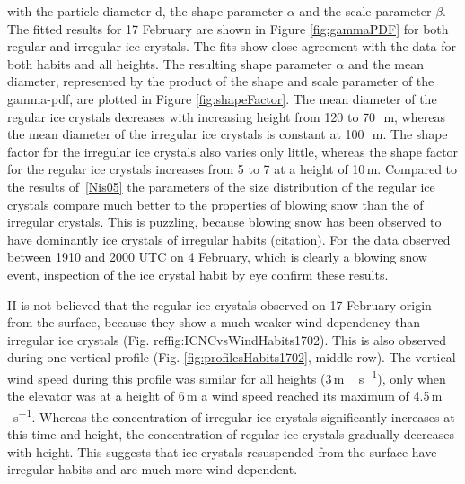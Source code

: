 \documentclass[draft,linenumbers]{agujournal}
\begin{document}
with the particle diameter d, the shape parameter $\alpha$ and the scale parameter $\beta$. The fitted results for 17 February are shown in Figure \ref{fig:gammaPDF} for both regular and irregular ice crystals. The fits show close agreement with the data for both habits and all heights. The resulting shape parameter $\alpha$ and the mean diameter, represented by the product of the shape and scale parameter of the gamma-pdf, are plotted in Figure \ref{fig:shapeFactor}. The mean diameter of the regular ice crystals decreases with increasing height from 120 to 70\,\si{\mu m}, whereas the mean diameter of the irregular ice crystals is constant at 100\,\si{\mu m}. The shape factor for the irregular ice crystals also varies only little, whereas the shape factor for the regular ice crystals increases from 5 to 7 at a height of 10\,\si{m}. Compared to the results of \,\ref{Nis05} the parameters of the size distribution of the regular ice crystals compare much better to the properties of blowing snow than the of irregular crystals. This is puzzling, because blowing snow has been observed to have dominantly ice crystals of irregular habits (citation). For the data observed between 1910 and 2000 UTC on 4 February, which is clearly a blowing snow event, inspection of the ice crystal habit by eye confirm these results. 

II is not believed that the regular ice crystals observed on 17 February origin from the surface, because they show a much weaker wind dependency than irregular ice crystals (Fig. ref{fig:ICNCvsWindHabits1702}). This is also observed during one vertical profile (Fig. \ref{fig:profilesHabits1702}, middle row). The vertical wind speed during this profile was similar for all heights (3\,\si{m\,s^{-1}}), only when the elevator was at a height of 6\,\si{m} a wind speed reached its maximum of 4.5\,\si{m\,s^{-1}}. Whereas the concentration of irregular ice crystals significantly increases at this time and height, the concentration of regular ice crystals gradually decreases with height. This suggests that ice crystals resuspended from the surface have irregular habits and are much more wind dependent. 
\end{document}
